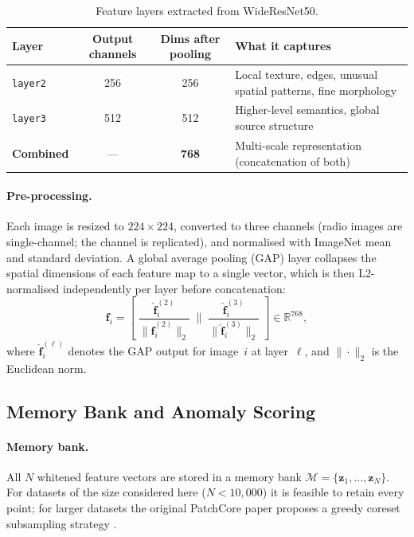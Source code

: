 \begin{table}[H]
\centering
\caption{Feature layers extracted from WideResNet50.}
\label{tab:layers}
\smallskip
\begin{tabular}{lccp{5.2cm}}
\toprule
\textbf{Layer} & \textbf{Output channels} & \textbf{Dims after pooling}
  & \textbf{What it captures} \\
\midrule
\texttt{layer2} & 256 & 256
  & Local texture, edges, unusual spatial patterns, fine morphology \\
\texttt{layer3} & 512 & 512
  & Higher-level semantics, global source structure \\
\midrule
\textbf{Combined} & --- & \textbf{768}
  & Multi-scale representation (concatenation of both) \\
\bottomrule
\end{tabular}
\end{table}

\paragraph{Pre-processing.}
Each image is resized to $224\times224$, converted to three channels
(radio images are single-channel; the channel is replicated), and
normalised with ImageNet mean and standard deviation.
A global average pooling (GAP) layer collapses the spatial dimensions of
each feature map to a single vector, which is then L2-normalised
independently per layer before concatenation:
\begin{equation}
  \mathbf{f}_i
  = \left[\;\frac{\hat{\mathbf{f}}_i^{(2)}}{\|\hat{\mathbf{f}}_i^{(2)}\|_2}\;\Big\|
           \;\frac{\hat{\mathbf{f}}_i^{(3)}}{\|\hat{\mathbf{f}}_i^{(3)}\|_2}\;\right]
  \in \mathbb{R}^{768},
\label{eq:concat}
\end{equation}
where $\hat{\mathbf{f}}_i^{(\ell)}$ denotes the GAP output for image~$i$
at layer~$\ell$, and $\|\cdot\|_2$ is the Euclidean norm.

\subsection{Memory Bank and Anomaly Scoring}
\label{sec:patchcore:scoring}

\paragraph{Memory bank.}
All $N$ whitened feature vectors are stored in a memory bank
$\mathcal{M} = \{\mathbf{z}_1, \ldots, \mathbf{z}_N\}$.
For datasets of the size considered here ($N < 10{,}000$) it is
feasible to retain every point; for larger datasets the original
PatchCore paper proposes a greedy coreset subsampling strategy
\citep{Roth2022}.

